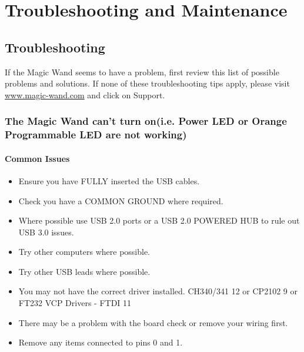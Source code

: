 %
%



\chapter{Troubleshooting and Maintenance}

\section{Troubleshooting}

If the Magic Wand seems to have a problem, first review this list of possible problems and solutions.
If none of these troubleshooting tips apply, please visit \url{www.magic-wand.com} and click on Support.


\subsection{The Magic Wand can't turn on(i.e. Power LED or Orange Programmable LED are not working)}

\subsubsection{Common Issues}

\begin{itemize}
	\item Ensure you have FULLY inserted the USB cables.
	\item Check you have a COMMON GROUND where required.
	\item Where possible use USB 2.0 ports or a USB 2.0 POWERED HUB to rule out USB 3.0 issues.
	\item Try other computers where possible.
	\item Try other USB leads where possible.
	\item You may not have the correct driver installed. CH340/341 12 or CP2102 9 or FT232 VCP Drivers - FTDI 11
	\item There may be a problem with the board check or remove your wiring first.
	\item Remove any items connected to pins 0 and 1.
\end{itemize}

